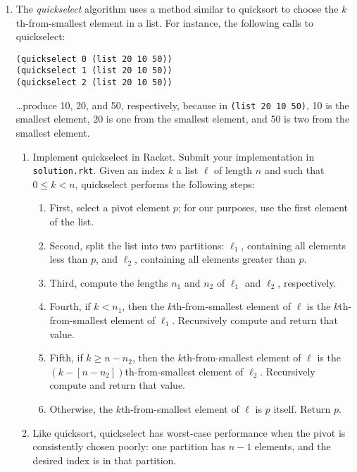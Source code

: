 \documentclass{article}
\begin{document}
\begin{enumerate}

  \pagebreak[2]
\item
  The \emph{quickselect} algorithm uses a method similar to quicksort to choose
  the \(k\)th-from-smallest element in a list.  For instance, the following
  calls to quickselect:
\begin{verbatim}
(quickselect 0 (list 20 10 50))
(quickselect 1 (list 20 10 50))
(quickselect 2 (list 20 10 50))
\end{verbatim}
  \dots produce 10, 20, and 50, respectively, because in
  \mbox{\texttt{(list~20~10~50)}}, 10 is the smallest element, 20 is one from
  the smallest element, and 50 is two from the smallest element.
  \begin{enumerate}
  \item
    Implement quickselect in Racket.  Submit your implementation in
    \texttt{solution.rkt}.  Given an index \(k\) a list \(\ell\) of length \(n\)
    and such that \(0 \leq k < n\), quickselect performs the following steps:
    \begin{enumerate}
    \item
      First, select a pivot element \(p\); for our purposes, use the first
      element of the list.
    \item
      Second, split the list into two partitions: \(\ell_1\), containing all
      elements less than \(p\), and \(\ell_2\), containing all elements greater
      than \(p\).
    \item
      Third, compute the lengths \(n_1\) and \(n_2\) of \(\ell_1\) and
      \(\ell_2\), respectively.
    \item
      Fourth, if \(k < n_1\), then the \(k\)th-from-smallest element of \(\ell\)
      is the \(k\)th-from-smallest element of \(\ell_1\).  Recursively compute
      and return that value.
    \item
      Fifth, if \(k \geq n - n_2\), then the \(k\)th-from-smallest element of
      \(\ell\) is the \((k - [n - n_2])\)th-from-smallest element of \(\ell_2\).
      Recursively compute and return that value.
    \item
      Otherwise, the \(k\)th-from-smallest element of \(\ell\) is \(p\) itself.
      Return \(p\).
    \end{enumerate}
  \item
    Like quicksort, quickselect has worst-case performance when the pivot is
    consistently chosen poorly: one partition has \(n-1\) elements, and the
    desired index is in that partition.

\end{enumerate}
\end{enumerate}
\end{document}
